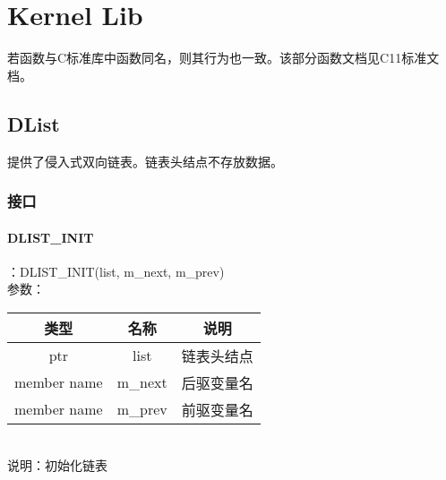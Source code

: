 %
% 
% 
% 
% 
% 
% 
%

\chapter{Kernel Lib}
若函数与C标准库中函数同名，则其行为也一致。该部分函数文档见C11标准文档。

\section{DList}
提供了侵入式双向链表。链表头结点不存放数据。

\subsection{接口}

\subsubsection{DLIST\_INIT}
：DLIST\_INIT(list, m\_next, m\_prev)\\
参数：\\
\begin{tabular}{|c|c|c|}
    \hline
    类型 & 名称 & 说明\\\hline
    ptr & list & 链表头结点\\\hline
    member name & m\_next & 后驱变量名\\\hline
    member name & m\_prev & 前驱变量名\\\hline
\end{tabular}\\
说明：初始化链表

